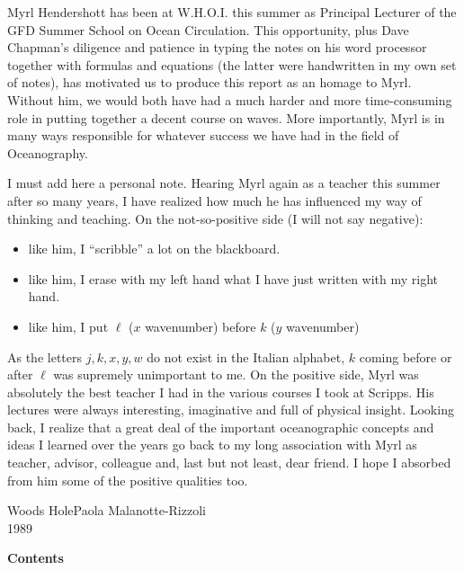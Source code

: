 Myrl Hendershott has been at W.H.O.I. this summer as Principal Lecturer of
the GFD Summer School on Ocean Circulation. This opportunity, plus Dave
Chapman's diligence and patience in typing the notes on his word processor together
with formulas and equations (the latter were handwritten in my own set of notes), has
motivated us to produce this report as an homage to Myrl. Without him, we would
both have had a much harder and more time-consuming role in putting together a
decent course on waves. More importantly, Myrl is in many ways responsible for
whatever success we have had in the field of Oceanography.

I must add here a personal note. Hearing Myrl again as a teacher this summer
after so many years, I have realized how much he has influenced my way of thinking
and teaching. On the not-so-positive side (I will not say negative):

\begin{itemize}[leftmargin=2.2em,itemsep=0.25em,topsep=0.3em]
	\item like him, I ``scribble'' a lot on the blackboard.
	\item like him, I erase with my left hand what I have just written with my right hand.
	\item like him, I put $\ell$ ($x$ wavenumber) before $k$ ($y$ wavenumber)
\end{itemize}

As the letters $j,k,x,y,w$ do not exist in the Italian alphabet, $k$ coming before or after
$\ell$ was supremely unimportant to me. On the positive side, Myrl was absolutely the
best teacher I had in the various courses I took at Scripps. His lectures were always
interesting, imaginative and full of physical insight. Looking back, I realize that a
great deal of the important oceanographic concepts and ideas I learned over the years
go back to my long association with Myrl as teacher, advisor, colleague and, last but
not least, dear friend. I hope I absorbed from him some of the positive qualities too.

\vspace{0.7em}
\noindent Woods Hole\hfill Paola Malanotte-Rizzoli\\
1989
\clearpage

\sourceblankpage

\vspace*{0.55in}
\begin{center}{\LARGE\bfseries Contents}\end{center}
\vspace{0.52in}

